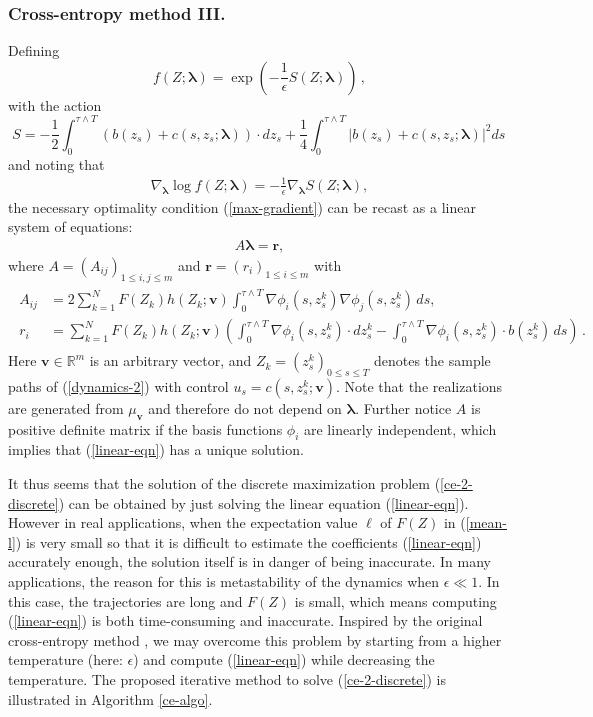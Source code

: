 \documentclass[final]{siamltex}
\newcommand{\eps}{\epsilon}
\newcommand{\blambda}{\bm{\lambda}}
\begin{document}
\subsubsection*{Cross-entropy method III.}
Defining 
\begin{equation}\label{girsanov5}
   f(Z;\blambda) = \exp\left(-\frac{1}{\eps}S(Z;\blambda)\right) \,, 
\end{equation}
with the action
\begin{equation}\label{girsanov6}
  S 
 =-\frac{1}{2}\int_0^{\tau\wedge T} (b(z_s)+c(s,z_{s};\blambda))\cdot dz_s +
  \frac{1}{4}\int_0^{\tau\wedge T} |b(z_s)+c(s,z_{s};\blambda)|^2ds \,
\end{equation}
and noting that 
\begin{align}
\nabla_{\blambda} \log f(Z;\blambda) = -\frac{1}{\eps}  \nabla_{\blambda} S(Z;\blambda),
\end{align}
the necessary optimality condition (\ref{max-gradient}) can be recast as a linear system of equations: 
\begin{align}
A\blambda = \bm{r},
\end{align}
where $A=(A_{ij})_{1\le i,j\le m}$ and $\bm{r}=(r_{i})_{1\le i\le m}$ with  
\begin{align}
  \begin{split}
  A_{ij} &= 2\sum_{k = 1}^{N} F(Z_k)h(Z_k; \bm{v}) \int_0^{\tau\wedge T}
  \nabla\phi_i(s,z^{k}_{s})\nabla\phi_j(s,z^{k}_{s})\,ds, \\
     r_i &= \sum_{k = 1}^{N} F(Z_k)h(Z_k; \bm{v})
  \left(\int_0^{\tau\wedge T} \nabla\phi_i(s,z^{k}_{s})\cdot dz^{k}_{s} - \int_0^{\tau\wedge T}  \nabla\phi_i(s,z^{k}_{s})\cdot b(z^{k}_{s})\,ds\right)\,. 
  \end{split}
  \label{linear-eqn}
\end{align}
Here $\bm{v}\in \mathbb{R}^m$ is an arbitrary vector, and $Z_k=(z^{k}_{s})_{0\le s\le T}$ denotes the sample paths of (\ref{dynamics-2}) with control $u_{s}=c(s,z^{k}_{s};\bm{v})$. Note that the realizations are generated from $\mu_{\bm{v}}$ and therefore do not depend on $\blambda$. Further notice  
$A$ is positive definite matrix if the basis functions $\phi_i$ are linearly
independent,  which implies that (\ref{linear-eqn}) has a unique solution. 

It thus seems that the solution of the discrete maximization problem (\ref{ce-2-discrete}) can be
obtained by just solving the linear equation (\ref{linear-eqn}). However in real
applications, when the expectation value $\ell$ of $F(Z)$ in (\ref{mean-l}) is very small so that it is
difficult to estimate the coefficients (\ref{linear-eqn}) accurately enough, the solution itself is in danger of being inaccurate. In many applications, the reason for this is metastability of the dynamics when $\eps\ll 1$. In this case, the
trajectories are long and $F(Z)$ is small, which means computing
(\ref{linear-eqn}) is both time-consuming and inaccurate. Inspired by the
original cross-entropy method \cite{ce_tutorial}, we may overcome this problem by starting from a higher temperature (here: $\eps$) and compute
(\ref{linear-eqn}) while decreasing the temperature. The proposed iterative
method to solve (\ref{ce-2-discrete}) is illustrated in Algorithm \ref{ce-algo}.
\end{document}
